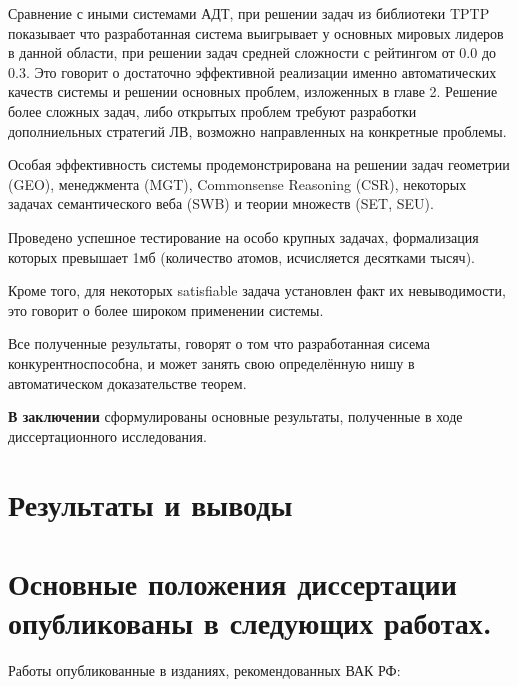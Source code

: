 \documentclass[a4paper]{report}
\begin{document}
Сравнение с иными системами АДТ, при решении задач из библиотеки TPTP показывает что разработанная система выигрывает у основных мировых лидеров в данной области, при решении задач средней сложности с рейтингом от 0.0 до 0.3. Это говорит о достаточно эффективной реализации именно автоматических качеств системы и решении основных проблем, изложенных в главе 2. Решение более сложных задач, либо открытых проблем требуют разработки дополниельных стратегий ЛВ, возможно направленных на конкретные проблемы.

Особая эффективность системы продемонстрирована на решении задач геометрии (GEO), менеджмента (MGT), Commonsense Reasoning (CSR),  некоторых задачах семантического веба (SWB) и теории множеств (SET, SEU). 

Проведено успешное тестирование на особо крупных задачах, формализация которых превышает 1мб (количество атомов, исчисляется десятками тысяч). 

Кроме того, для некоторых satisfiable задача установлен факт их невыводимости, это говорит о более широком применении системы.

Все полученные результаты, говорят о том что разработанная сисема конкурентноспособна, и может занять свою определённую нишу в автоматическом доказательстве теорем.

\textbf{В заключении} сформулированы основные результаты, полученные в ходе диссертационного исследования.

\section*{Результаты и выводы}


\section*{Основные положения диссертации опубликованы в следующих работах.}

Работы опубликованные в изданиях, рекомендованных ВАК РФ:
\end{document}
